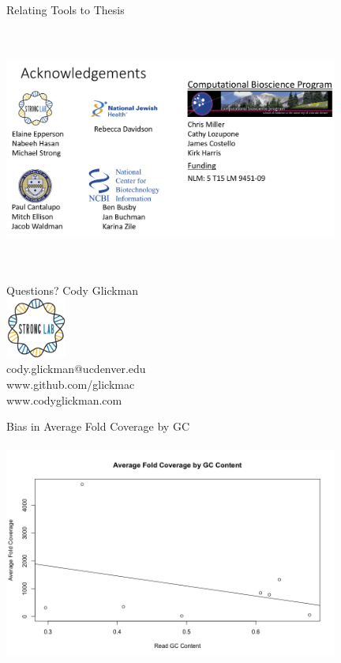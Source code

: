 \documentclass[11pt]{beamer}
\begin{document}
	\begin{frame}{Relating Tools to Thesis}
	\end{frame}
	
	\begin{frame}{}
	\vspace{1cm}
	{\includegraphics[height=8cm, width=11cm]{Acknowledgements.png} }
	\end{frame}
	
	
	\begin{frame}{Questions?}
	\center
	Cody Glickman \\ \includegraphics[height=2cm, width=2cm]{lablogo.png} \\ cody.glickman@ucdenver.edu \\ \alert{www.github.com/glickmac} \\ www.codyglickman.com
	\end{frame}
	
	
	\begin{frame}{Bias in Average Fold Coverage by GC}
	\includegraphics[height=8cm, width=11cm]{Viral_Coverage_by_GC.png}
	\end{frame}
	
\end{document}
